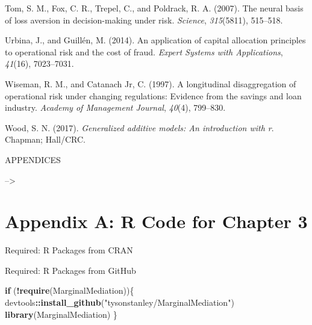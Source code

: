 \documentclass[]{DissertateUSU}
\newenvironment{Shaded}{\begin{snugshade}}{\end{snugshade}}
\newcommand{\KeywordTok}[1]{\textcolor[rgb]{0.13,0.29,0.53}{\textbf{#1}}}
\newcommand{\StringTok}[1]{\textcolor[rgb]{0.31,0.60,0.02}{#1}}
\newcommand{\ControlFlowTok}[1]{\textcolor[rgb]{0.13,0.29,0.53}{\textbf{#1}}}
\newcommand{\OperatorTok}[1]{\textcolor[rgb]{0.81,0.36,0.00}{\textbf{#1}}}
\newcommand{\NormalTok}[1]{#1}
\begin{document}
\hypertarget{ref-tom2007neural}{}
Tom, S. M., Fox, C. R., Trepel, C., and Poldrack, R. A. (2007). The
neural basis of loss aversion in decision-making under risk.
\emph{Science}, \emph{315}(5811), 515--518.

\hypertarget{ref-urbina2014application}{}
Urbina, J., and Guillén, M. (2014). An application of capital allocation
principles to operational risk and the cost of fraud. \emph{Expert
Systems with Applications}, \emph{41}(16), 7023--7031.

\hypertarget{ref-wiseman1997longitudinal}{}
Wiseman, R. M., and Catanach Jr, C. (1997). A longitudinal
disaggregation of operational risk under changing regulations: Evidence
from the savings and loan industry. \emph{Academy of Management
Journal}, \emph{40}(4), 799--830.

\hypertarget{ref-wood2017generalized}{}
Wood, S. N. (2017). \emph{Generalized additive models: An introduction
with r}. Chapman; Hall/CRC.

\clearpage
{} 
\fancyhead[R]{\thepage} \fancyfoot[C]{}

\vspace*{\fill}

\begin{center}
    APPENDICES 
  \end{center}

\vspace*{\fill}

\clearpage

--\textgreater{}

\doublespacing

\section*{Appendix A: R Code for Chapter
3}\label{appendix-a-r-code-for-chapter-3}

\singlespace

Required: R Packages from CRAN

\small

\normalsize

Required: R Packages from GitHub

\small

\begin{Shaded}
\begin{Highlighting}[]
\ControlFlowTok{if}\NormalTok{ (}\OperatorTok{!}\KeywordTok{require}\NormalTok{(MarginalMediation))\{}
\NormalTok{  devtools}\OperatorTok{::}\KeywordTok{install_github}\NormalTok{(}\StringTok{"tysonstanley/MarginalMediation"}\NormalTok{)}
  \KeywordTok{library}\NormalTok{(MarginalMediation)}
\NormalTok{\}}
\end{Highlighting}
\end{Shaded}
\end{document}
